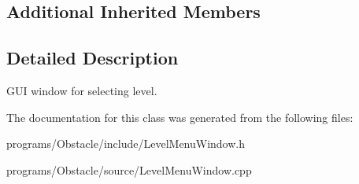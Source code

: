 \subsection*{Additional Inherited Members}


\subsection{Detailed Description}
G\+UI window for selecting level. 

The documentation for this class was generated from the following files\+:\begin{DoxyCompactItemize}
\item 
programs/\+Obstacle/include/Level\+Menu\+Window.\+h\item 
programs/\+Obstacle/source/Level\+Menu\+Window.\+cpp\end{DoxyCompactItemize}
